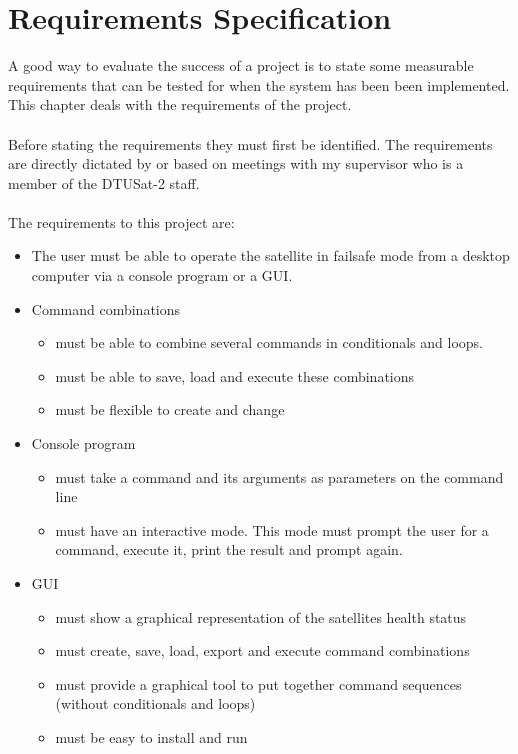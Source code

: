 \chapter{Requirements Specification}
\label{chap:requirements_specification}
A good way to evaluate the success of a project is to state some measurable requirements that can be tested for when the system has been been implemented. This chapter deals with the requirements of the project.
\\ \\
Before stating the requirements they must first be identified. The requirements are directly dictated by or based on meetings with my supervisor who is a member of the DTUSat-2 staff.
\\ \\
The requirements to this project are:
\begin{itemize}

	\item The user must be able to operate the satellite in failsafe mode from a desktop computer via a console program or a GUI.

	\item Command combinations
	\begin{itemize}
		\item	must be able to combine several commands in conditionals and loops.
		\item must be able to save, load and execute these combinations
		\item	must be flexible to create and change
	\end{itemize}

	\item Console program
	\begin{itemize}
		\item must take a command and its arguments as parameters on the command line
		\item must have an interactive mode. This mode must prompt the user for a command, execute it, print the result and prompt again.
	\end{itemize}

	\item GUI
	\begin{itemize}
		\item must show a graphical representation of the satellites health status
		\item must create, save, load, export and execute command combinations
		\item must provide a graphical tool to put together command sequences (without conditionals and loops)
		\item must be easy to install and run
	\end{itemize}


\end{itemize}
